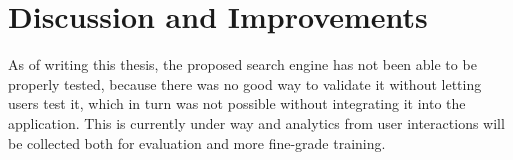 \documentclass[draft,final]{vutinfth} %
\begin{document}






\chapter{Discussion and Improvements} \label{chap:discussion}
As of writing this thesis, the proposed search engine has not been able to be properly tested, because there was no good way to validate it without letting users test it, which in turn was not possible without integrating it into the application. This is currently under way and analytics from user interactions will be collected both for evaluation and more fine-grade training.
\end{document}
